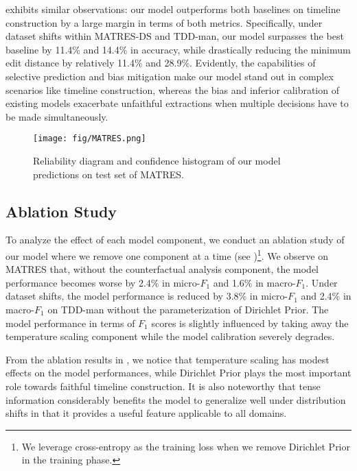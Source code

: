 \documentclass[11pt]{article}
\begin{document}
 exhibits similar observations: our model outperforms both baselines on timeline construction by a large margin in terms of both metrics.
Specifically, under dataset shifts within MATRES-DS and TDD-man, our model surpasses the best baseline by 11.4\% and 14.4\% in accuracy, while drastically reducing the minimum edit distance by relatively 11.4\% and 28.9\%.
Evidently, the capabilities of selective prediction and bias mitigation make our model stand out in complex scenarios like timeline construction, whereas the bias and inferior calibration of existing models exacerbate unfaithful extractions when multiple decisions have to be made simultaneously. \begin{figure}[t]
    \centering
    \texttt{[image: fig/MATRES.png]}
    \vspace{-1em}
    \caption{Reliability diagram and confidence histogram of our model predictions on test set of MATRES.}\label{fig:diagram}
    \vspace{-1em}
\end{figure}
\subsection{Ablation Study}
\label{sec:ablation}
To analyze the effect of each model component, we conduct an ablation study of our model where we remove one component at a time (see )\footnote{We leverage cross-entropy as the training loss when we remove Dirichlet Prior in the training phase.}.
We observe on MATRES that, without the counterfactual analysis component, the model performance becomes worse by 2.4\% in micro-$F_1$ and 1.6\% in macro-$F_1$.
Under dataset shifts, the model performance is reduced by 3.8\% in micro-$F_1$ and 2.4\% in macro-$F_1$ on TDD-man without the parameterization of Dirichlet Prior.
The model performance in terms of $F_1$ scores is slightly influenced by taking away the temperature scaling component while the model calibration severely degrades.

From the ablation results in , we notice that temperature scaling has modest effects on the model performances, while Dirichlet Prior plays the most important role towards faithful timeline construction.
It is also noteworthy that tense information considerably benefits the model to generalize well under distribution shifts in that it provides a useful feature applicable to all domains.
\end{document}
